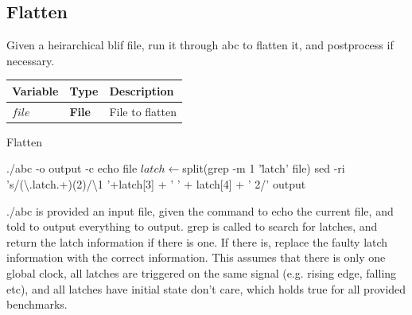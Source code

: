 \documentclass[12pt,final,oneside]{dwThesis} %
\begin{document}
   \subsection{Flatten}\label{algFlatten}
   Given a heirarchical blif file, run it through abc\cite{abc} to flatten it, and postprocess if necessary.
   \begin{algorithm}
      \begin{center}
         \begin{tabularx}{\linewidth}{llX}
            \toprule
            Variable & Type & Description\\
            \midrule
            $file$ &\textbf{  File } &  File to flatten\\
            \bottomrule
         \end{tabularx}
      \end{center}
      \caption{Flatten}\label{Flatten}
      \begin{algorithmic}[1]
         \State ./abc -o output -c echo file
         \State $latch \gets $split(grep -m 1 '\.latch' file)
         \State sed -ri 's/(\textbackslash.latch.+)(2)/\textbackslash1 '+latch[3] + ' ' + latch[4] + ' 2/' output
         \EndIf
         \EndProcedure
      \end{algorithmic}
   \end{algorithm}

   ./abc is provided an input file, given the command to echo the current file,
   and told to output everything to output.
   grep is called to search for latches, and return the latch information if
   there is one. If there is, replace the faulty latch information with the
   correct information.
   This assumes that there is only one global clock, all latches are triggered on
   the same signal (e.g. rising edge, falling etc), and all latches have initial
   state don't care, which holds true for all provided benchmarks.
\end{document}
